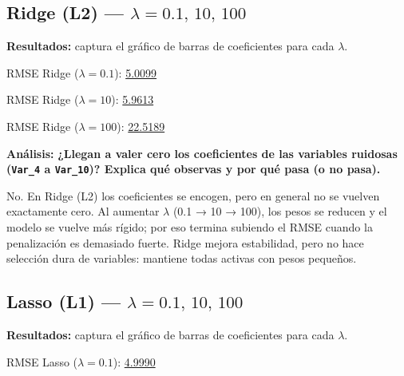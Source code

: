 \documentclass[12pt,oneside]{book}
\begin{document}
\subsection{Ridge (L2) — $\lambda = 0.1,\, 10,\, 100$}

\noindent\textbf{Resultados:} captura el gráfico de barras de coeficientes para cada $\lambda$.

\begin{center}
\end{center}
\noindent RMSE Ridge ($\lambda=0.1$): \underline{5.0099}

\begin{center}
\end{center}
\noindent RMSE Ridge ($\lambda=10$): \underline{5.9613}

\vspace{0.4cm}
\begin{center}
\end{center}
\noindent RMSE Ridge ($\lambda=100$): \underline{22.5189}

\vspace{0.4cm}
\noindent\textbf{Análisis:}
\textbf{¿Llegan a valer \textbf{cero} los coeficientes de las variables ruidosas (\texttt{Var\_4} a \texttt{Var\_10})?
Explica qué observas y por qué pasa (o no pasa).}

No. En Ridge (L2) los coeficientes se encogen, pero en general no se vuelven exactamente cero.
Al aumentar $\lambda$ (0.1 → 10 → 100), los pesos se reducen y el modelo se vuelve más rígido; por eso termina subiendo el RMSE cuando la penalización es demasiado fuerte.
Ridge mejora estabilidad, pero no hace selección dura de variables: mantiene todas activas con pesos pequeños.


\newpage
\subsection{Lasso (L1) — $\lambda = 0.1,\, 10,\, 100$}

\noindent\textbf{Resultados:} captura el gráfico de barras de coeficientes para cada $\lambda$.

\vspace{0.2cm}
\begin{center}
\end{center}
\noindent RMSE Lasso ($\lambda=0.1$): \underline{4.9990}
\end{document}
